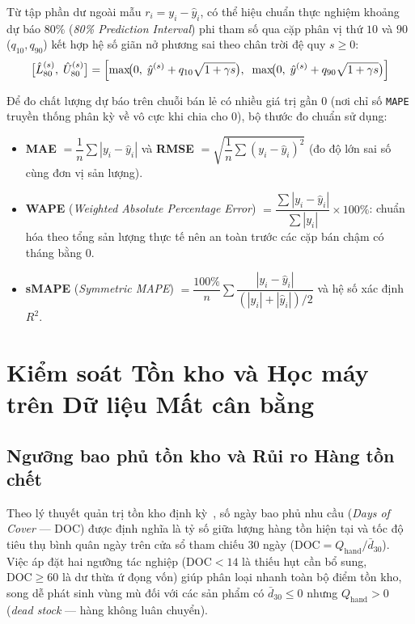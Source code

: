 Từ tập phần dư ngoài mẫu $r_i = y_i - \hat{y}_i$, có thể hiệu chuẩn thực nghiệm khoảng dự báo $80\%$ (\textit{80\% Prediction Interval}) phi tham số qua cặp phân vị thứ $10$ và $90$ ($q_{10}, q_{90}$) kết hợp hệ số giãn nở phương sai theo chân trời đệ quy $s \ge 0$:
\begin{equation}
	\bigl[\hat{L}^{(s)}_{80},\; \hat{U}^{(s)}_{80}\bigr] = \Bigl[\max\!\bigl(0,\;\hat{y}^{(s)} + q_{10}\sqrt{1 + \gamma s}\bigr),\;\; \max\!\bigl(0,\;\hat{y}^{(s)} + q_{90}\sqrt{1 + \gamma s}\bigr)\Bigr]
\end{equation}

Để đo chất lượng dự báo trên chuỗi bán lẻ có nhiều giá trị gần $0$ (nơi chỉ số \texttt{MAPE} truyền thống phân kỳ về vô cực khi chia cho $0$), bộ thước đo chuẩn sử dụng:
\begin{itemize}[topsep=0pt, itemsep=1pt]
	\item \textbf{MAE} $= \dfrac{1}{n}\sum |y_i - \hat{y}_i|$ và \textbf{RMSE} $= \sqrt{\dfrac{1}{n}\sum (y_i - \hat{y}_i)^2}$ (đo độ lớn sai số cùng đơn vị sản lượng).
	\item \textbf{WAPE} (\textit{Weighted Absolute Percentage Error}) $= \dfrac{\sum |y_i - \hat{y}_i|}{\sum |y_i|} \times 100\%$: chuẩn hóa theo tổng sản lượng thực tế nên an toàn trước các cặp bán chậm có tháng bằng $0$.
	\item \textbf{sMAPE} (\textit{Symmetric MAPE}) $= \dfrac{100\%}{n}\sum \dfrac{|y_i - \hat{y}_i|}{(|y_i| + |\hat{y}_i|)/2}$ và hệ số xác định $R^2$.
\end{itemize}

\section{Kiểm soát Tồn kho và Học máy trên Dữ liệu Mất cân bằng}
\label{sec:bg-imbalanced}

\subsection{Ngưỡng bao phủ tồn kho và Rủi ro Hàng tồn chết}
Theo lý thuyết quản trị tồn kho định kỳ~\cite{silver2016inventory}, số ngày bao phủ nhu cầu (\textit{Days of Cover} --- $\text{DOC}$) được định nghĩa là tỷ số giữa lượng hàng tồn hiện tại và tốc độ tiêu thụ bình quân ngày trên cửa sổ tham chiếu $30$ ngày ($\text{DOC} = Q_{\text{hand}} / \bar{d}_{30}$). Việc áp đặt hai ngưỡng tác nghiệp ($\text{DOC} < 14$ là thiếu hụt cần bổ sung, $\text{DOC} \ge 60$ là dư thừa ứ đọng vốn) giúp phân loại nhanh toàn bộ điểm tồn kho, song dễ phát sinh vùng mù đối với các sản phẩm có $\bar{d}_{30} \le 0$ nhưng $Q_{\text{hand}} > 0$ (\textit{dead stock} --- hàng không luân chuyển).

